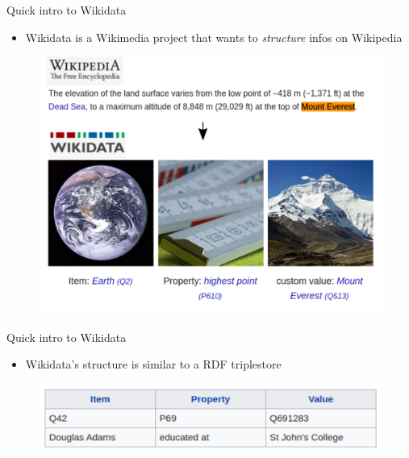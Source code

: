 \documentclass{beamer}
\begin{document}
\begin{frame}{Quick intro to Wikidata}

\begin{itemize}
    \item Wikidata is a Wikimedia project that wants to \textit{structure} infos on Wikipedia
\end{itemize}

\begin{figure}
\includegraphics[scale=0.45]{fig/intro wikidata.png}
\end{figure}

\end{frame}


\begin{frame}{Quick intro to Wikidata}

\begin{itemize}
    \item Wikidata's structure is similar to a RDF triplestore
\end{itemize}
\begin{figure}
\includegraphics[scale=0.45]{fig/item_property_value.png}
\end{figure}

\end{frame}
\end{document}
